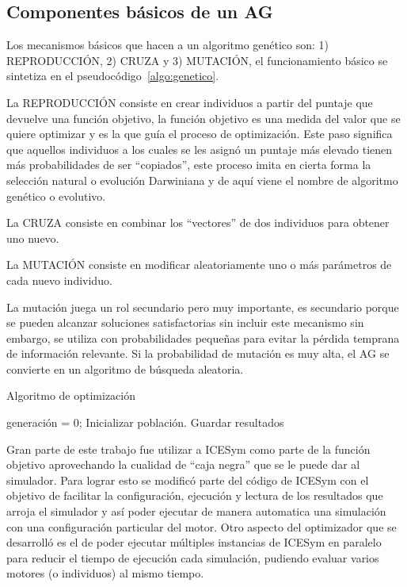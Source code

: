 \subsection{Componentes básicos de un AG}
%
Los mecanismos básicos que hacen a un algoritmo genético son: 1) REPRODUCCIÓN,
2) CRUZA y 3) MUTACIÓN, el funcionamiento básico se sintetiza en el
pseudocódigo~\ref{algo:genetico}.

La REPRODUCCIÓN consiste en crear individuos a partir del puntaje que devuelve
una función objetivo, la función objetivo es una medida del valor que se quiere
optimizar y es la que guía el proceso de optimización.
%
Este paso significa que aquellos individuos a los cuales se les asignó un
puntaje más elevado tienen más probabilidades de ser ``copiados'', este proceso
imita en cierta forma la selección natural o evolución Darwiniana y de aquí
viene el nombre de algoritmo genético o evolutivo.

La CRUZA consiste en combinar los ``vectores'' de dos individuos para obtener
uno nuevo.

La MUTACIÓN consiste en modificar aleatoriamente uno o más parámetros de cada
nuevo individuo.

La mutación juega un rol secundario pero muy importante, es secundario porque se
pueden alcanzar soluciones satisfactorias sin incluir este mecanismo sin
embargo, se utiliza con probabilidades pequeñas para evitar la pérdida temprana
de información relevante.
%
Si la probabilidad de mutación es muy alta, el AG se convierte en un algoritmo
de búsqueda aleatoria.


\begin{algorithm} \caption{Algoritmo de optimización}\label{algo:genetico}
  generación = 0;
  Inicializar población.\;
  {Guardar resultados\;}
\end{algorithm}

%
%
Gran parte de este trabajo fue utilizar a ICESym como parte de la función
objetivo aprovechando la cualidad de ``caja negra'' que se le puede dar al
simulador.
%
Para lograr esto se modificó parte del código de ICESym con el objetivo de
facilitar la configuración, ejecución y lectura de los resultados que arroja el
simulador y así poder ejecutar de manera automatica una simulación con una
configuración particular del motor.
%
Otro aspecto del optimizador que se desarrolló es el de poder ejecutar múltiples
instancias de ICESym en paralelo para reducir el tiempo de ejecución cada
simulación, pudiendo evaluar varios motores (o individuos) al mismo tiempo.


